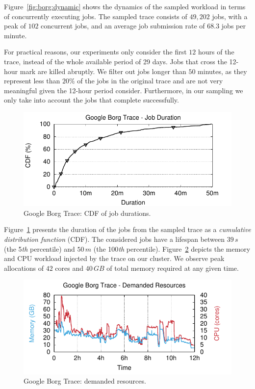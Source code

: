 Figure~\ref{fig:borg:dynamic} shows the dynamics of the sampled workload in terms of concurrently executing jobs.
The sampled trace consists of $49,202$ jobs, with a peak of $102$ concurrent jobs, and an average job submission rate of $68.3$ jobs per minute.

For practical reasons, our experiments only consider the first $12$ hours of the trace, instead of the whole available period of 29 days.
Jobs that cross the 12-hour mark are killed abruptly.
We filter out jobs longer than $50$ minutes, as they represent less than $20\%$ of the jobs in the original trace and are not very meaningful given the 12-hour period consider.
Furthermore, in our sampling we only take into account the jobs that complete successfully.

\begin{figure}[t!]
  \centering
  \includegraphics[]{figures/plots/borg/jobs_duration}
  \caption{Google Borg Trace: CDF of job durations.}
  \label{fig:borg:duration}
\end{figure}

Figure~\ref{fig:borg:duration} presents the duration of the jobs from the sampled trace as a \emph{cumulative distribution function} (CDF).
The considered jobs have a lifespan between $39\,s$ (the 5\emph{th} percentile) and $50\,m$ (the 100\emph{th} percentile).
Figure~\ref{fig:borg:resources} depicts the memory and CPU workload injected by the trace on our cluster.
We observe peak allocations of $42$ cores and $40\,GB$ of total memory required at any given time.

\begin{figure}[t!]
  \centering
  \includegraphics[]{figures/plots/borg/trace_resources}
  \caption{Google Borg Trace: demanded resources.}
  \label{fig:borg:resources}
\end{figure}

